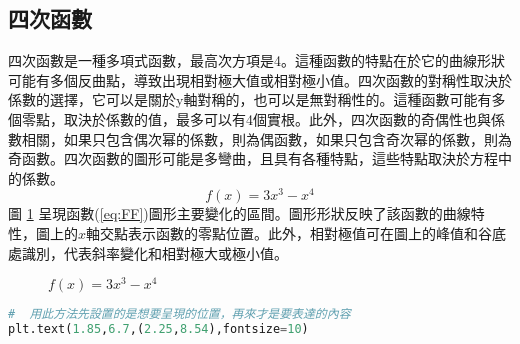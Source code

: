 \subsection{四次函數}
四次函數是一種多項式函數，最高次方項是4。這種函數的特點在於它的曲線形狀可能有多個反曲點，導致出現相對極大值或相對極小值。四次函數的對稱性取決於係數的選擇，它可以是關於y軸對稱的，也可以是無對稱性的。這種函數可能有多個零點，取決於係數的值，最多可以有4個實根。此外，四次函數的奇偶性也與係數相關，如果只包含偶次幂的係數，則為偶函數，如果只包含奇次幂的係數，則為奇函數。四次函數的圖形可能是多彎曲，且具有各種特點，這些特點取決於方程中的係數。
\begin{equation}\label{eq:FF}
f(x)= 3x^3 - x^4
\end{equation}
圖 \ref{fig:FF} 呈現函數(\ref{eq:FF})圖形主要變化的區間。圖形形狀反映了該函數的曲線特性，圖上的$x$軸交點表示函數的零點位置。此外，相對極值可在圖上的峰值和谷底處識別，代表斜率變化和相對極大或極小值。
\begin{figure}[H]
    \caption{$f(x)=3x^3 - x^4$}
    \label{fig:FF}
\end{figure}
\begin{lstlisting}[language=Python]
#  用此方法先設置的是想要呈現的位置，再來才是要表達的內容
plt.text(1.85,6.7,(2.25,8.54),fontsize=10)
\end{lstlisting}
